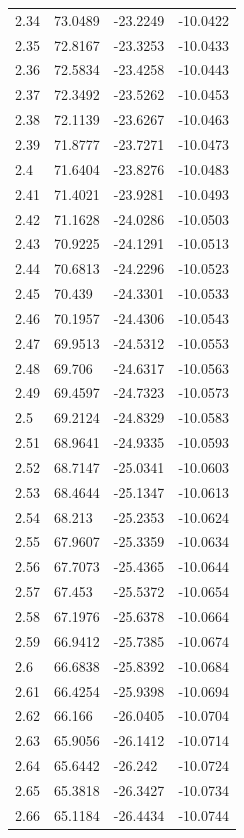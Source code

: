 \begin{tabular}{llll}
2.34 & 73.0489 & -23.2249 & -10.0422 \\
2.35 & 72.8167 & -23.3253 & -10.0433 \\
2.36 & 72.5834 & -23.4258 & -10.0443 \\
2.37 & 72.3492 & -23.5262 & -10.0453 \\
2.38 & 72.1139 & -23.6267 & -10.0463 \\
2.39 & 71.8777 & -23.7271 & -10.0473 \\
2.4 & 71.6404 & -23.8276 & -10.0483 \\
2.41 & 71.4021 & -23.9281 & -10.0493 \\
2.42 & 71.1628 & -24.0286 & -10.0503 \\
2.43 & 70.9225 & -24.1291 & -10.0513 \\
2.44 & 70.6813 & -24.2296 & -10.0523 \\
2.45 & 70.439 & -24.3301 & -10.0533 \\
2.46 & 70.1957 & -24.4306 & -10.0543 \\
2.47 & 69.9513 & -24.5312 & -10.0553 \\
2.48 & 69.706 & -24.6317 & -10.0563 \\
2.49 & 69.4597 & -24.7323 & -10.0573 \\
2.5 & 69.2124 & -24.8329 & -10.0583 \\
2.51 & 68.9641 & -24.9335 & -10.0593 \\
2.52 & 68.7147 & -25.0341 & -10.0603 \\
2.53 & 68.4644 & -25.1347 & -10.0613 \\
2.54 & 68.213 & -25.2353 & -10.0624 \\
2.55 & 67.9607 & -25.3359 & -10.0634 \\
2.56 & 67.7073 & -25.4365 & -10.0644 \\
2.57 & 67.453 & -25.5372 & -10.0654 \\
2.58 & 67.1976 & -25.6378 & -10.0664 \\
2.59 & 66.9412 & -25.7385 & -10.0674 \\
2.6 & 66.6838 & -25.8392 & -10.0684 \\
2.61 & 66.4254 & -25.9398 & -10.0694 \\
2.62 & 66.166 & -26.0405 & -10.0704 \\
2.63 & 65.9056 & -26.1412 & -10.0714 \\
2.64 & 65.6442 & -26.242 & -10.0724 \\
2.65 & 65.3818 & -26.3427 & -10.0734 \\
2.66 & 65.1184 & -26.4434 & -10.0744 \\

\end{tabular}
